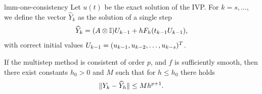 \begin{Lemma}{lmm-one-consistency}
  Let $u(t)$ be the exact solution of the IVP. For $k=s,\ldots$, we
  define the vector $\widehat Y_{k}$ as the solution of a single step
  \begin{gather*}
    \widehat Y_{k} = (A \otimes \mathbb I) U_{k-1} + h F_h(t_{k-1} U_{k-1}),
  \end{gather*}
  with correct initial values $U_{k-1} =
  (u_{k-1},u_{k-2},\dots,u_{k-s})^T$.
  
  If the multistep method is consistent of order $p$, and $f$ is
  sufficiently smooth, then there exist constants $h_0>0$  and $M$
  such that for $h\le h_0$ there holds
  \begin{gather}
    \label{eq:lmm-one-consistency:1}
    \lVert Y_k-\widehat Y_h\rVert \le M h^{p+1}.
  \end{gather}
\end{Lemma}


